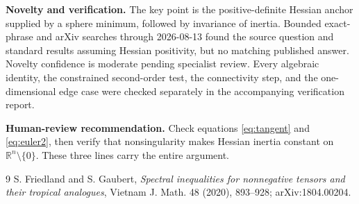 \documentclass[11pt]{article}
\newcommand{\R}{\mathbb R}
\begin{document}
\textbf{Novelty and verification.} The key point is the positive-definite
Hessian anchor supplied by a sphere minimum, followed by invariance of
inertia. Bounded exact-phrase and arXiv searches through 2026-08-13 found the
source question and standard results assuming Hessian positivity, but no
matching published answer. Novelty confidence is moderate pending specialist
review. Every algebraic identity, the constrained second-order test, the
connectivity step, and the one-dimensional edge case were checked separately
in the accompanying verification report.

\textbf{Human-review recommendation.} Check equations
\eqref{eq:tangent} and \eqref{eq:euler2}, then verify that nonsingularity makes
Hessian inertia constant on $\R^n\setminus\{0\}$. These three lines carry the
entire argument.

\begin{thebibliography}{9}
S. Friedland and S. Gaubert,
\emph{Spectral inequalities for nonnegative tensors and their tropical analogues},
Vietnam J. Math. 48 (2020), 893--928; arXiv:1804.00204.
\end{thebibliography}
\end{document}
